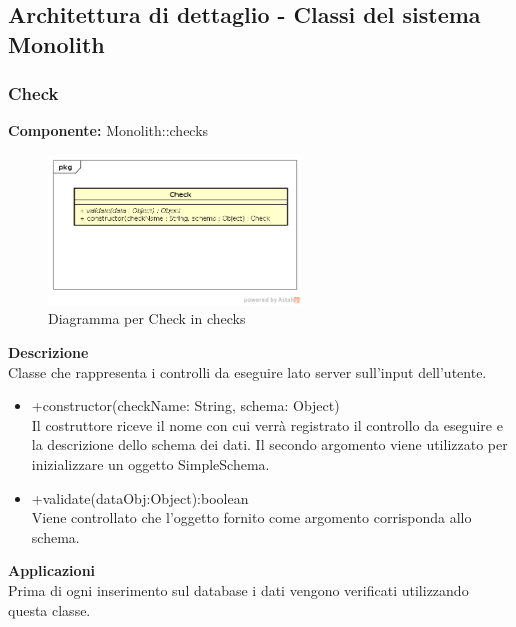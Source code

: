 \clearpage

\subsection{Architettura di dettaglio - Classi del sistema Monolith}\subsubsection{Check}
\textbf{Componente:}  Monolith::checks\\
   \FloatBarrier
   \begin{figure}[ht]
   \centering
   \includegraphics[width=0.6\textwidth]{img/single-Check.png}
   \caption{{Diagramma per Check in checks}}
\end{figure}
\FloatBarrier
\textbf{Descrizione}\\
Classe che rappresenta i controlli da eseguire lato server sull'input dell'utente. 
\begin{itemize}
\item +constructor(checkName: String, schema: Object) \\
Il costruttore riceve il nome con cui verrà registrato il controllo da eseguire e la descrizione dello schema dei dati. Il secondo argomento viene utilizzato per inizializzare un oggetto SimpleSchema.
\item +validate(dataObj:Object):boolean \\
Viene controllato che l'oggetto fornito come argomento corrisponda allo schema.
\end{itemize} 


\textbf{Applicazioni}\\
Prima di ogni inserimento sul database i dati vengono verificati utilizzando questa classe. 


\clearpage

